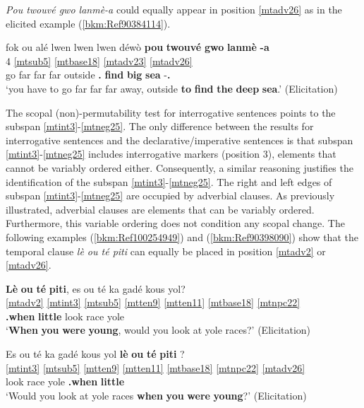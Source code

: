 \documentclass[output=paper]{langscibook}
\begin{document}
\textit{Pou twouvé gwo lanmè-a} could equally appear in position \ref{mtadv26} as in the elicited example (\ref{bkm:Ref90384114}).


\ea\label{bkm:Ref90384114}
\glll fok ou alé lwen lwen lwen déwò \textbf{pou} \textbf{twouvé} \textbf{gwo} \textbf{lanmè} \textbf{-a}\\
4 \ref{mtsub5} \ref{mtbase18} \ref{mtadv23} {} {} {} \ref{mtadv26} {} {} {} {} \\
\Obl{} \Second\Sg{} go far far far outside \textbf{\Sub.\Purp{}} \textbf{find} \textbf{big} \textbf{sea} -\textbf{\Def.\Art{}}\\
\glt `you have to go far far far away, outside \textbf{to} \textbf{find} \textbf{the} \textbf{deep} \textbf{sea}.' (Elicitation)
\z 

The scopal (non)-permutability test for interrogative sentences points to the subspan \ref{mtint3}-\ref{mtneg25}. The only difference between the results for interrogative sentences and the declarative/imperative sentences is that subspan \ref{mtint3}-\ref{mtneg25} includes interrogative markers (position 3), elements that cannot be variably ordered either. Consequently, a similar reasoning justifies the identification of the subspan \ref{mtint3}-\ref{mtneg25}. The right and left edges of subspan \ref{mtint3}-\ref{mtneg25} are occupied by adverbial clauses. As previously illustrated, adverbial clauses are elements that can be variably ordered. Furthermore, this variable ordering does not condition any scopal change. The following examples (\ref{bkm:Ref100254949}) and (\ref{bkm:Ref90398090}) show that the temporal clause \textit{lè ou té piti} can equally be placed in position \ref{mtadv2} or \ref{mtadv26}.

\ea\label{bkm:Ref100254949}
\glll \textbf{Lè} \textbf{ou} \textbf{té} \textbf{piti}, es ou té ka gadé kous yol?\\
\ref{mtadv2} {} {} {} \ref{mtint3} \ref{mtsub5} \ref{mtten9} \ref{mtten11} \ref{mtbase18} \ref{mtnpc22} {} \\ 
\textbf{\Sub{}.when} \textbf{\Second\Sg{}} \textbf{\Pst{}} \textbf{little} \Q{} \Second\Sg{} \Pst{} \Impf{} look race yole\protect\footnotemark\\
\glt `\textbf{When} \textbf{you} \textbf{were} \textbf{young}, would you look at yole races?' (Elicitation)
\z
{}

\ea\label{bkm:Ref90398090}
\glll Es ou té ka gadé kous yol \textbf{lè} \textbf{ou} \textbf{té} \textbf{piti} ?\\
\ref{mtint3} \ref{mtsub5} \ref{mtten9} \ref{mtten11} \ref{mtbase18} \ref{mtnpc22} {} \ref{mtadv26} {} {} {} \\
\Q{} \Second\Sg{} \Pst{} \Impf{} look race yole \textbf{\Sub{}.when} \textbf{\Second\Sg{}} \textbf{\Pst{}} \textbf{little}\\
\glt `Would you look at yole races \textbf{when} \textbf{you} \textbf{were} \textbf{young}?' (Elicitation)
\z
\end{document}
